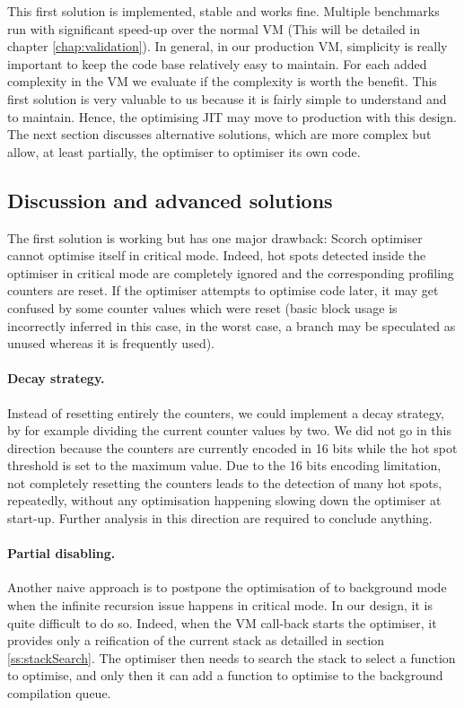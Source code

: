 \documentclass[a4paper,12pt,twoside]{../includes/ThesisStyle}
\begin{document}
This first solution is implemented, stable and works fine. Multiple benchmarks run with significant speed-up over the normal VM (This will be detailed in chapter \ref{chap:validation}). In general, in our production VM, simplicity is really important to keep the code base relatively easy to maintain. For each added complexity in the VM we evaluate if the complexity is worth the benefit. This first solution is very valuable to us because it is fairly simple to understand and to maintain. Hence, the optimising JIT may move to production with this design. The next section discusses alternative solutions, which are more complex but allow, at least partially, the optimiser to optimiser its own code.

\subsection{Discussion and advanced solutions}

The first solution is working but has one major drawback: Scorch optimiser cannot optimise itself in critical mode. Indeed, hot spots detected inside the optimiser in critical mode are completely ignored and the corresponding profiling counters are reset. If the optimiser attempts to optimise code later, it may get confused by some counter values which were reset (basic block usage is incorrectly inferred in this case, in the worst case, a branch may be speculated as unused whereas it is frequently used). 

\paragraph{Decay strategy.} Instead of resetting entirely the counters, we could implement a decay strategy, by for example dividing the current counter values by two. We did not go in this direction because the counters are currently encoded in 16 bits while the hot spot threshold is set to the maximum value. Due to the 16 bits encoding limitation, not completely resetting the counters leads to the detection of many hot spots, repeatedly, without any optimisation happening slowing down the optimiser at start-up. Further analysis in this direction are required to conclude anything.

\paragraph{Partial disabling.} \label{par:PartialDisabing} Another naive approach is to postpone the optimisation of to background mode when the infinite recursion issue happens in critical mode. In our design, it is quite difficult to do so. Indeed, when the VM call-back starts the optimiser, it provides only a reification of the current stack as detailled in section \ref{ss:stackSearch}. The optimiser then needs to search the stack to select a function to optimise, and only then it can add a function to optimise to the background compilation queue. 
\end{document}
